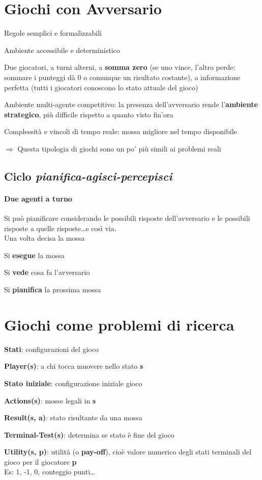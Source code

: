 \documentclass[10pt]{book}
\begin{document}
\section{Giochi con Avversario}
\begin{list}{-}{}
	\item Regole semplici e formalizzabili
	\item Ambiente accessibile e deterministico
	\item Due giocatori, a turni alterni, a \textbf{somma zero} (se uno vince, l'altro perde: sommare i punteggi dà 0 o comunque un risultato costante), a informazione perfetta (tutti i giocatori conoscono lo stato attuale del gioco)
	\item Ambiente multi-agente competitivo: la presenza dell'avversario rende l'\textbf{ambiente strategico}, più difficile rispetto a quanto visto fin'ora
	\item Complessità e vincoli di tempo reale: mossa migliore nel tempo disponibile
\end{list}
$\Rightarrow$ Questa tipologia di giochi sono un po' più simili ai problemi reali
\subsection{Ciclo \textit{pianifica-agisci-percepisci}}
\paragraph{Due agenti a turno} Si può pianificare considerando le possibili risposte dell'avversario e le possibili risposte a quelle risposte\ldots e così via.\\
Una volta decisa la mossa
\begin{list}{}{}
	\item Si \textbf{esegue} la mossa
	\item Si \textbf{vede} cosa fa l'avversario
	\item Si \textbf{pianifica} la prossima mossa
\end{list}
\pagebreak
\section{Giochi come problemi di ricerca}
\begin{list}{}{}
	\item \textbf{Stati}: configurazioni del gioco
	\item \textbf{Player(s)}: a chi tocca muovere nello stato \textbf{s}
	\item \textbf{Stato iniziale}: configurazione iniziale gioco
	\item \textbf{Actions(s)}: mosse legali in \textbf{s}
	\item \textbf{Result(s, a)}: stato risultante da una mossa
	\item \textbf{Terminal-Test(s)}: determina se stato è fine del gioco
	\item \textbf{Utility(s, p)}: utilità (o \textbf{pay-off}), cioè valore numerico degli stati terminali del gioco per il giocatore \textbf{p}\\
	Es: 1, -1, 0, conteggio punti\ldots
\end{list}
\end{document}
